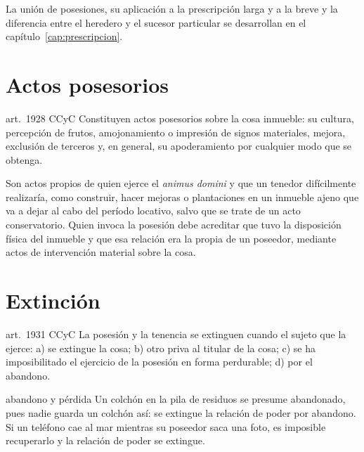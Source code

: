 \documentclass[12pt,oneside]{book}
\begin{document}
La unión de posesiones, su aplicación a la prescripción larga y a la breve y la diferencia entre el heredero y el sucesor particular se desarrollan en el capítulo~\ref{cap:prescripcion}.

\section{Actos posesorios}

\begin{regla}{art.~1928 CCyC}
Constituyen actos posesorios sobre la cosa inmueble: su cultura, percepción de frutos, amojonamiento o impresión de signos materiales, mejora, exclusión de terceros y, en general, su apoderamiento por cualquier modo que se obtenga.
\end{regla}

Son actos propios de quien ejerce el \textit{animus domini} y que un tenedor difícilmente realizaría, como construir, hacer mejoras o plantaciones en un inmueble ajeno que va a dejar al cabo del período locativo, salvo que se trate de un acto conservatorio. Quien invoca la posesión debe acreditar que tuvo la disposición física del inmueble y que esa relación era la propia de un poseedor, mediante actos de intervención material sobre la cosa.

\section{Extinción}

\begin{regla}{art.~1931 CCyC}
La posesión y la tenencia se extinguen cuando el sujeto que la ejerce: a) se extingue la cosa; b) otro priva al titular de la cosa; c) se ha imposibilitado el ejercicio de la posesión en forma perdurable; d) por el abandono.
\end{regla}

\begin{ejemplo}{abandono y pérdida}
Un colchón en la pila de residuos se presume abandonado, pues nadie guarda un colchón así: se extingue la relación de poder por abandono. Si un teléfono cae al mar mientras su poseedor saca una foto, es imposible recuperarlo y la relación de poder se extingue.
\end{ejemplo}
\end{document}
